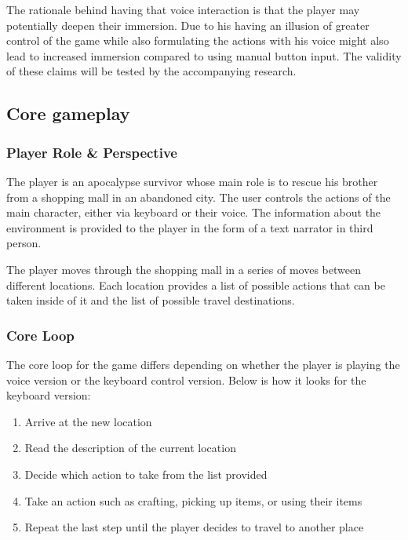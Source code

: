 The rationale behind having that voice interaction is that the player may potentially deepen their immersion.
Due to his having an illusion of greater control of the game while also formulating the actions with his voice
might also lead to increased immersion compared to using manual button input. The validity of these claims
will be tested by the accompanying research.

\subsection{Core gameplay}

\subsubsection{Player Role \& Perspective}

The player is an apocalypse survivor whose main role is to rescue his brother from a shopping mall in an abandoned city. The user controls the actions of the main character, either via keyboard or their voice. The information about the environment is provided to the player in the form of a text narrator in third person.

The player moves through the shopping mall in a series of moves between different locations. Each location provides a list of possible actions that can be taken inside of it and the list of possible travel destinations. 

\subsubsection{Core Loop}


The core loop for the game differs depending on whether the player is playing the voice version or the keyboard control version.
Below is how it looks for the keyboard version:

\begin{enumerate}

    \item Arrive at the new location

    \item Read the description of the current location

    \item Decide which action to take from the list provided

    \item Take an action such as crafting, picking up items, or using their items

    \item Repeat the last step until the player decides to travel to another place 

\end{enumerate}

